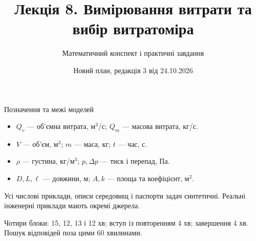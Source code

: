 \documentclass[aspectratio=169,11pt]{beamer}
\title{Лекція 8. Вимірювання витрати та вибір витратоміра}
\subtitle{Математичний конспект і практичні завдання}
\date{Новий план, редакція 3 від 24.10.2026}
\begin{document}
\begin{frame}\titlepage\end{frame}
\begin{frame}{Позначення та межі моделей}
\begin{itemize}
\item $Q_v$ --- об'ємна витрата, м$^3$/с; $Q_m$ --- масова витрата, кг/с.
\item $V$ --- об'єм, м$^3$; $m$ --- маса, кг; $t$ --- час, с.
\item $\rho$ --- густина, кг/м$^3$; $p,\Delta p$ --- тиск і перепад, Па.
\item $D,L,\ell$ --- довжини, м; $A,k$ --- площа та коефіцієнт, м$^2$.
\end{itemize}
Усі числові приклади, описи середовищ і паспорти задач синтетичні. Реальні інженерні приклади мають окремі джерела.

Чотири блоки: 15, 12, 13 і 12 хв; вступ із повторенням 4 хв; завершення 4 хв. Пошук відповідей поза цими 60 хвилинами.
\end{frame}
\end{document}
